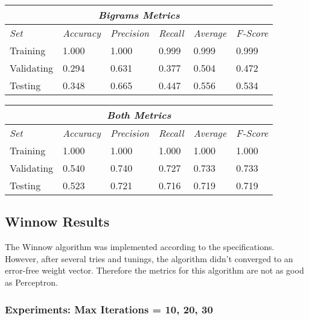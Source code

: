 \documentclass[11pt]{article}
\begin{document}
\hfill \break

\begin{tabular}{ |p{2cm}||p{2cm}|p{2cm}|p{2cm}|p{2cm}|p{2cm}|  }
 \hline
 \multicolumn{6}{|c|}{\textbf{\textit{Bigrams Metrics}}} \\
 \hline
 \textit{Set} & \textit{Accuracy} & \textit{Precision} & \textit{Recall} & \textit{Average} & \textit{F-Score} \\
 \hline
 Training   & 1.000 & 1.000 & 0.999 & 0.999 & 0.999 \\
 Validating & 0.294 & 0.631 & 0.377 & 0.504 & 0.472 \\
 Testing    & 0.348 & 0.665 & 0.447 & 0.556 & 0.534 \\
 \hline
\end{tabular}

\hfill \break

\begin{tabular}{ |p{2cm}||p{2cm}|p{2cm}|p{2cm}|p{2cm}|p{2cm}|  }
 \hline
 \multicolumn{6}{|c|}{\textbf{\textit{Both Metrics}}} \\
 \hline
 \textit{Set} & \textit{Accuracy} & \textit{Precision} & \textit{Recall} & \textit{Average} & \textit{F-Score} \\
 \hline
 Training   & 1.000 & 1.000 & 1.000 & 1.000 & 1.000 \\
 Validating & 0.540 & 0.740 & 0.727 & 0.733 & 0.733 \\
 Testing    & 0.523 & 0.721 & 0.716 & 0.719 & 0.719 \\
 \hline
\end{tabular}


\subsection{Winnow Results}

The Winnow algorithm was implemented according to the specifications. However, after several tries and tunings, the algorithm didn't converged to an error-free weight vector. Therefore the metrics for this algorithm are not as good as Perceptron.

\subsubsection{Experiments: Max Iterations = 10, 20, 30}
\end{document}
